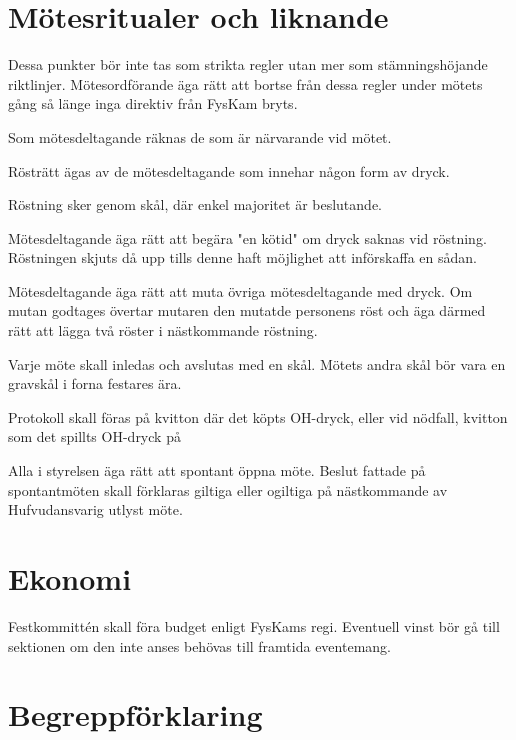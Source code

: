 \documentclass{../resources/dgovdoc}
\begin{document}
\section{Mötesritualer och liknande}

Dessa punkter bör inte tas som strikta regler utan mer som stämningshöjande riktlinjer. Mötesordförande äga rätt att bortse från dessa regler under mötets gång så länge inga direktiv från FysKam bryts.

Som mötesdeltagande räknas de som är närvarande vid mötet.

Rösträtt ägas av de mötesdeltagande som innehar någon form av dryck.

Röstning sker genom skål, där enkel majoritet är beslutande.

Mötesdeltagande äga rätt att begära "en kötid" om dryck saknas vid röstning. Röstningen skjuts då upp tills denne haft möjlighet att införskaffa en sådan.

Mötesdeltagande äga rätt att muta övriga mötesdeltagande med dryck. Om mutan godtages övertar mutaren den mutatde personens röst och äga därmed rätt att lägga två röster i nästkommande röstning.

Varje möte skall inledas och avslutas med en skål. Mötets andra skål bör vara en gravskål i forna festares ära.

Protokoll skall föras på kvitton där det köpts OH-dryck, eller vid nödfall, kvitton som det spillts OH-dryck på

Alla i styrelsen äga rätt att spontant öppna möte. Beslut fattade på spontantmöten skall förklaras giltiga eller ogiltiga på nästkommande av Hufvudansvarig utlyst möte.

\section{Ekonomi}

Festkommittén skall föra budget enligt FysKams regi.
Eventuell vinst bör gå till sektionen om den inte anses behövas till framtida eventemang.

\section{Begreppförklaring}
\end{document}
